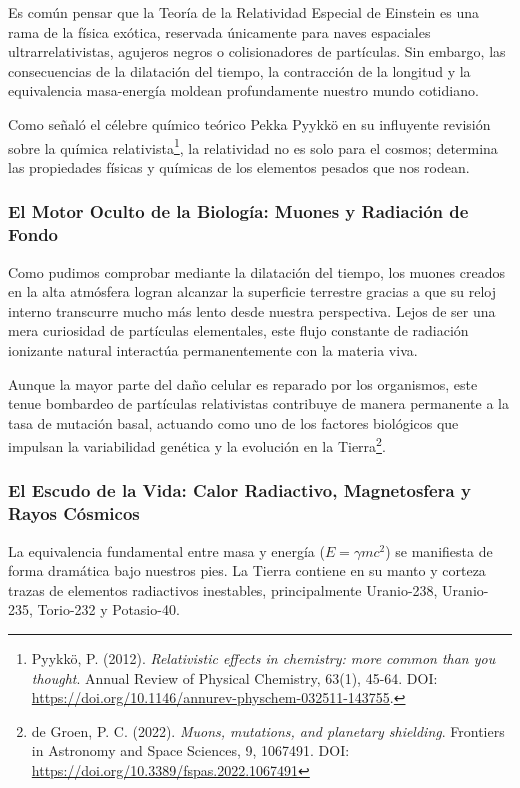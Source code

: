 \documentclass[11pt,a4paper]{book}
\begin{document}
Es común pensar que la Teoría de la Relatividad Especial de Einstein es una rama de la física exótica, reservada únicamente para naves espaciales ultrarrelativistas, agujeros negros o colisionadores de partículas. Sin embargo, las consecuencias de la dilatación del tiempo, la contracción de la longitud y la equivalencia masa-energía moldean profundamente nuestro mundo cotidiano. 

Como señaló el célebre químico teórico Pekka Pyykkö en su influyente revisión sobre la química relativista\footnote{Pyykkö, P. (2012). \textit{Relativistic effects in chemistry: more common than you thought}. Annual Review of Physical Chemistry, 63(1), 45-64. DOI: \url{https://doi.org/10.1146/annurev-physchem-032511-143755}.}, la relatividad no es solo para el cosmos; determina las propiedades físicas y químicas de los elementos pesados que nos rodean.

\subsubsection{El Motor Oculto de la Biología: Muones y Radiación de Fondo}

Como pudimos comprobar mediante la dilatación del tiempo, los muones creados en la alta atmósfera logran alcanzar la superficie terrestre gracias a que su reloj interno transcurre mucho más lento desde nuestra perspectiva. Lejos de ser una mera curiosidad de partículas elementales, este flujo constante de radiación ionizante natural interactúa permanentemente con la materia viva. 

Aunque la mayor parte del daño celular es reparado por los organismos, este tenue bombardeo de partículas relativistas contribuye de manera permanente a la tasa de mutación basal, actuando como uno de los factores biológicos que impulsan la variabilidad genética y la evolución en la Tierra\footnote{de Groen, P. C. (2022). \textit{Muons, mutations, and planetary shielding}. Frontiers in Astronomy and Space Sciences, 9, 1067491. DOI: \url{https://doi.org/10.3389/fspas.2022.1067491}}.

\subsubsection{El Escudo de la Vida: Calor Radiactivo, Magnetosfera y Rayos Cósmicos}

La equivalencia fundamental entre masa y energía ($E = \gamma m c^2$) se manifiesta de forma dramática bajo nuestros pies. La Tierra contiene en su manto y corteza trazas de elementos radiactivos inestables, principalmente Uranio-238, Uranio-235, Torio-232 y Potasio-40. 
\end{document}
